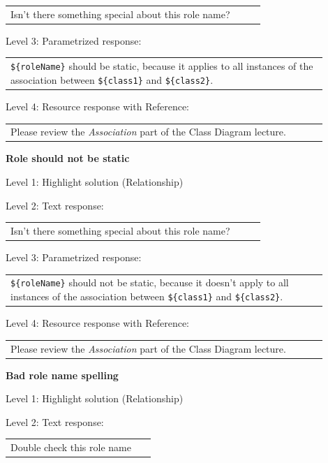\begin{tabular}{|p{0.9\linewidth}}
Isn't there something special about this role name?
\end{tabular} \medskip

\noindent Level 3: Parametrized response: \medskip

\begin{tabular}{|p{0.9\linewidth}}
\verb|${roleName}| should be static, because it applies to all instances of the association between \verb|${class1}| and \verb|${class2}|.
\end{tabular} \medskip

\noindent Level 4: Resource response with Reference: \medskip

\begin{tabular}{|p{0.9\linewidth}}
Please review the \textit{Association} part of the Class Diagram lecture.
\end{tabular} \medskip


\noindent \textbf{Role should not be static} \medskip

\noindent Level 1: Highlight solution (Relationship) \medskip

\noindent Level 2: Text response: \medskip

\begin{tabular}{|p{0.9\linewidth}}
Isn't there something special about this role name?
\end{tabular} \medskip

\noindent Level 3: Parametrized response: \medskip

\begin{tabular}{|p{0.9\linewidth}}
\verb|${roleName}| should not be static, because it doesn't apply to all instances of the association between \verb|${class1}| and \verb|${class2}|.
\end{tabular} \medskip

\noindent Level 4: Resource response with Reference: \medskip

\begin{tabular}{|p{0.9\linewidth}}
Please review the \textit{Association} part of the Class Diagram lecture.
\end{tabular} \medskip


\noindent \textbf{Bad role name spelling} \medskip

\noindent Level 1: Highlight solution (Relationship) \medskip

\noindent Level 2: Text response: \medskip

\begin{tabular}{|p{0.9\linewidth}}
Double check this role name
\end{tabular} \medskip

